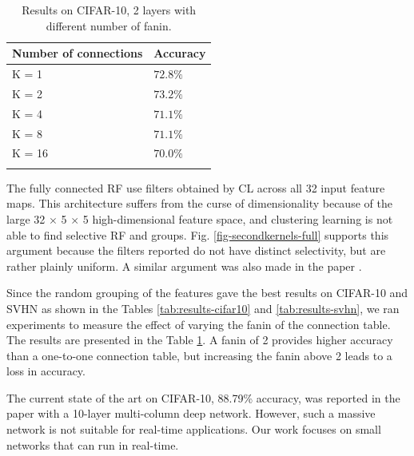 \documentclass{article} %
\begin{document}
\setlength{\tabcolsep}{10pt}

\begin{table}
\caption{Results on CIFAR-10, 2 layers with different number of fanin.}
\begin{centering}
\begin{tabular}{ll}
\multicolumn{1}{c}{\bf Number of connections}  &\multicolumn{1}{c}{\bf Accuracy}\\
\hline
K = 1		&$72.8\%$\\
K = 2		&$73.2\%$\\
K = 4		&$71.1\%$\\
K = 8		&$71.1\%$\\
K = 16		&$70.0\%$\\
\hline
\label{tab:fanin}
\end{tabular}
\par %
\end{centering}

\end{table}

The fully connected RF use filters obtained by CL across all 32 input feature maps. This architecture suffers from the curse of dimensionality because of the large 32 $\times$ 5 $\times$ 5 high-dimensional feature space, and clustering learning is not able to find selective RF and groups.
Fig. \ref{fig-secondkernels-full} supports this argument because the filters reported do not have distinct selectivity, but are rather plainly uniform. A similar argument was also made in the paper \cite{coates2012learning}.

Since the random grouping of the features gave the best results on CIFAR-10 and SVHN as shown in the Tables \ref{tab:results-cifar10} and \ref{tab:results-svhn}, we ran experiments to measure the effect of varying the fanin of the connection table.
The results are presented in the Table \ref{tab:fanin}. A fanin of 2 provides higher accuracy than a one-to-one connection table, but increasing the fanin above 2 leads to a loss in accuracy.

The current state of the art on CIFAR-10, 88.79\% accuracy, was reported in the paper \cite{dan2012multicolnet} with a 10-layer multi-column deep network. However,
such a massive network is not suitable for real-time applications. Our work focuses on small networks that can run in real-time.
\end{document}
